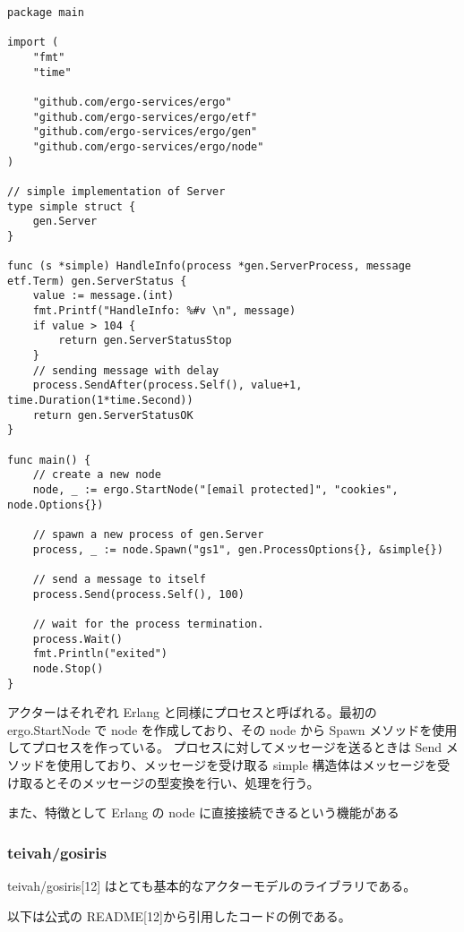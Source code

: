 \begin{verbatim}
package main

import (
    "fmt"
    "time"

    "github.com/ergo-services/ergo"
    "github.com/ergo-services/ergo/etf"
    "github.com/ergo-services/ergo/gen"
    "github.com/ergo-services/ergo/node"
)

// simple implementation of Server
type simple struct {
    gen.Server
}

func (s *simple) HandleInfo(process *gen.ServerProcess, message etf.Term) gen.ServerStatus {
    value := message.(int)
    fmt.Printf("HandleInfo: %#v \n", message)
    if value > 104 {
        return gen.ServerStatusStop
    }
    // sending message with delay
    process.SendAfter(process.Self(), value+1, time.Duration(1*time.Second))
    return gen.ServerStatusOK
}

func main() {
    // create a new node
    node, _ := ergo.StartNode("[email protected]", "cookies", node.Options{})

    // spawn a new process of gen.Server
    process, _ := node.Spawn("gs1", gen.ProcessOptions{}, &simple{})

    // send a message to itself
    process.Send(process.Self(), 100)

    // wait for the process termination.
    process.Wait()
    fmt.Println("exited")
    node.Stop()
}
\end{verbatim}

アクターはそれぞれ Erlang と同様にプロセスと呼ばれる。最初の
ergo.StartNode で node を作成しており、その node から Spawn
メソッドを使用してプロセスを作っている。
プロセスに対してメッセージを送るときは Send
メソッドを使用しており、メッセージを受け取る simple
構造体はメッセージを受け取るとそのメッセージの型変換を行い、処理を行う。

また、特徴として Erlang の node に直接接続できるという機能がある

\subsubsection{teivah/gosiris}

teivah/gosiris{[}12{]}
はとても基本的なアクターモデルのライブラリである。

以下は公式の README{[}12{]}から引用したコードの例である。

